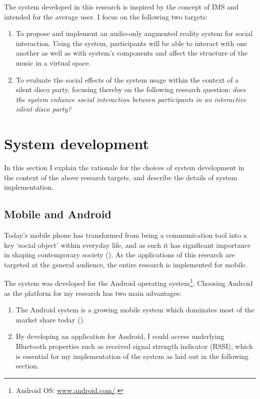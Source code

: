 \documentclass[a4paper,11pt]{article}
\begin{document}

The system developed in this research is inspired by the concept of IMS and intended for the average user.
I focus on the following two targets:
\begin{enumerate}
	\item To propose and implement an audio-only augmented reality system for social interaction.
	Using the system, participants will be able to interact with one another as well as with system's components and affect the structure of the music in a virtual space.
	\item To evaluate the social effects of the system usage within the context of a silent disco party, focusing thereby on the following research question: \emph{does the system enhance social interaction between participants in an interactive silent disco party?}
\end{enumerate}

\section{System development}

In this section I explain the rationale for the choices of system development in the context of the above research targets, and describe the details of system implementation.

\subsection{Mobile and Android}

Today's mobile phone has transformed from being a communication tool into a key `social object' within everyday life, and as such it has significant importance in shaping contemporary society (\cite{srivastava05}).
As the applications of this research are targeted at the general audience, the entire research is implemented for mobile.

The system was developed for the Android operating system\footnote{Android OS: \href{http://www.android.com/}{www.android.com/}.}.
Choosing Android as the platform for my research has two main advantages:
\begin{enumerate}
	\item The Android system is a growing mobile system which dominates most of the market share today (\cite{web:idc}).
	\item By developing an application for Android, I could access underlying Bluetooth properties such as received signal strength indicator (RSSI), which is essential for my implementation of the system as laid out in the following section.
\end{enumerate}
\end{document}
